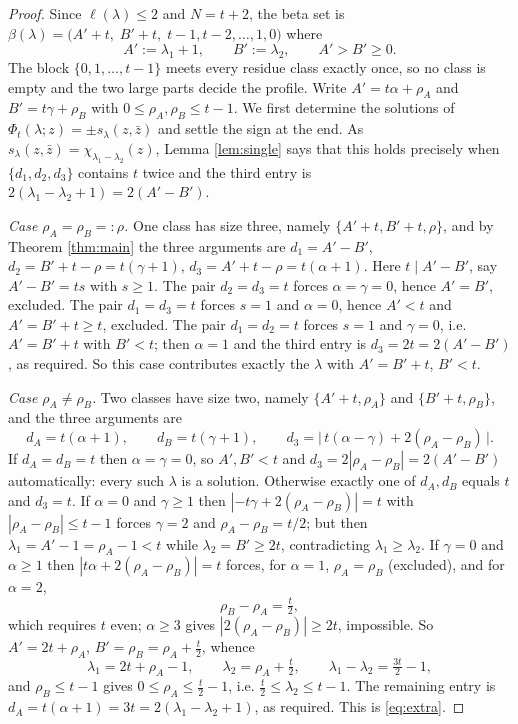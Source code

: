 \documentclass[11pt,reqno]{amsart}
\theoremstyle{plain}
\theoremstyle{definition}
\newcommand{\zb}{\bar z}
\begin{document}
\begin{proof}
Since $\ell(\lambda)\le 2$ and $N=t+2$, the beta set is
$\beta(\lambda)=\bigl(A'+t,\;B'+t,\;t-1,t-2,\dots,1,0\bigr)$ where
\[
A':=\lambda_1+1,\qquad B':=\lambda_2,\qquad A'>B'\ge0 .
\]
The block $\{0,1,\dots,t-1\}$ meets every residue class exactly once, so no class is empty and the
two large parts decide the profile. Write $A'=t\alpha+\rho_A$ and $B'=t\gamma+\rho_B$ with
$0\le\rho_A,\rho_B\le t-1$. We first determine the solutions of
$\Phi_t(\lambda;z)=\pm s_\lambda(z,\zb)$ and settle the sign at the end. As
$s_\lambda(z,\zb)=\chi_{\lambda_1-\lambda_2}(z)$, Lemma
\ref{lem:single} says that this holds precisely when $\{d_1,d_2,d_3\}$ contains $t$ twice
and the third entry is $2(\lambda_1-\lambda_2+1)=2(A'-B')$.

\emph{Case $\rho_A=\rho_B=:\rho$.} One class has size three, namely $\{A'+t,B'+t,\rho\}$, and by
Theorem \ref{thm:main} the three arguments are
$d_1=A'-B'$, $d_2=B'+t-\rho=t(\gamma+1)$, $d_3=A'+t-\rho=t(\alpha+1)$. Here $t\mid A'-B'$, say
$A'-B'=ts$ with $s\ge1$. The pair $d_2=d_3=t$ forces $\alpha=\gamma=0$, hence $A'=B'$, excluded.
The pair $d_1=d_3=t$ forces $s=1$ and $\alpha=0$, hence $A'<t$ and $A'=B'+t\ge t$, excluded. The pair
$d_1=d_2=t$ forces $s=1$ and $\gamma=0$, i.e. $A'=B'+t$ with $B'<t$; then $\alpha=1$ and the third
entry is $d_3=2t=2(A'-B')$, as required. So this case contributes exactly the $\lambda$ with
$A'=B'+t$, $B'<t$.

\emph{Case $\rho_A\ne\rho_B$.} Two classes have size two, namely $\{A'+t,\rho_A\}$ and
$\{B'+t,\rho_B\}$, and the three arguments are
\[
d_A=t(\alpha+1),\qquad d_B=t(\gamma+1),\qquad
d_3=\bigl|\,t(\alpha-\gamma)+2(\rho_A-\rho_B)\,\bigr| .
\]
If $d_A=d_B=t$ then $\alpha=\gamma=0$, so $A',B'<t$ and $d_3=2|\rho_A-\rho_B|=2(A'-B')$
automatically: every such $\lambda$ is a solution. Otherwise exactly one of $d_A,d_B$ equals $t$ and
$d_3=t$. If $\alpha=0$ and $\gamma\ge1$ then $|-t\gamma+2(\rho_A-\rho_B)|=t$ with
$|\rho_A-\rho_B|\le t-1$ forces $\gamma=2$ and $\rho_A-\rho_B=t/2$; but then
$\lambda_1=A'-1=\rho_A-1<t$ while $\lambda_2=B'\ge2t$, contradicting $\lambda_1\ge\lambda_2$. If
$\gamma=0$ and $\alpha\ge1$ then $|t\alpha+2(\rho_A-\rho_B)|=t$ forces, for $\alpha=1$,
$\rho_A=\rho_B$ (excluded), and for $\alpha=2$,
\[
\rho_B-\rho_A=\tfrac t2,
\]
which requires $t$ even; $\alpha\ge3$ gives $|2(\rho_A-\rho_B)|\ge2t$, impossible. So $A'=2t+\rho_A$,
$B'=\rho_B=\rho_A+\tfrac t2$, whence
\[
\lambda_1=2t+\rho_A-1,\qquad \lambda_2=\rho_A+\tfrac t2,\qquad
\lambda_1-\lambda_2=\tfrac{3t}{2}-1,
\]
and $\rho_B\le t-1$ gives $0\le\rho_A\le\tfrac t2-1$, i.e. $\tfrac t2\le\lambda_2\le t-1$. The
remaining entry is $d_A=t(\alpha+1)=3t=2(\lambda_1-\lambda_2+1)$, as required. This is
\eqref{eq:extra}.


\end{proof}
\end{document}
